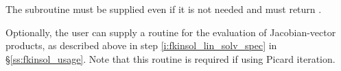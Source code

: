 \begin{Steps}
  {\warn}The subroutine  must be supplied even if it is not needed
  and must return .

  Optionally, the user can supply a routine  for the evaluation of
  Jacobian-vector products, as described above in step \ref{i:fkinsol_lin_solv_spec}
  in \S\ref{ss:fkinsol_usage}.  Note that this routine is required if using
  Picard iteration.

\end{Steps}
